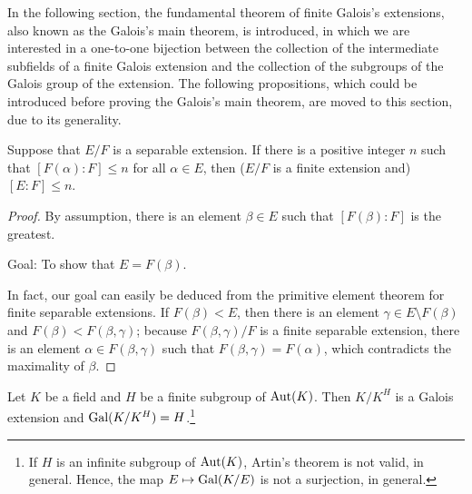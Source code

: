 In the following section, the fundamental theorem of finite Galois's extensions, also known as the Galois's main theorem, is introduced, in which we are interested in a one-to-one bijection between the collection of the intermediate subfields of a finite Galois extension and the collection of the subgroups of the Galois group of the extension.
The following propositions, which could be introduced before proving the Galois's main theorem, are moved to this section, due to its generality.
\begin{prop}\label{maximality_of_primitive}
    Suppose that $E/F$ is a separable extension.
    If there is a positive integer $n$ such that $[F(\alpha): F]\leq n$ for all $\alpha\in E$, then ($E/F$ is a finite extension and) $[E:F]\leq n$. 
\end{prop}
\begin{proof}
    By assumption, there is an element $\beta\in E$ such that $[F(\beta): F]$ is the greatest.
    \begin{center}
        Goal: To show that $E=F(\beta)$.
    \end{center}
    In fact, our goal can easily be deduced from the primitive element theorem for finite separable extensions.
    If $F(\beta)<E$, then there is an element $\gamma\in E\setminus F(\beta)$ and $F(\beta)<F(\beta, \gamma)$; because $F(\beta, \gamma)/F$ is a finite separable extension, there is an element $\alpha\in F(\beta, \gamma)$ such that $F(\beta, \gamma)=F(\alpha)$, which contradicts the maximality of $\beta$.
\end{proof}
\begin{lem}
    Let $K$ be a field and $H$ be a finite subgroup of ${\textrm{Aut}({K})}$.
    Then $K/K^H$ is a Galois extension and ${\textrm{Gal}({K/K^H})}=H$.\footnote{If $H$ is an infinite subgroup of ${\textrm{Aut}({K})}$, Artin's theorem is not valid, in general. Hence, the map $E\mapsto{\textrm{Gal}({K/E})}$ is not a surjection, in general.}
\end{lem}
